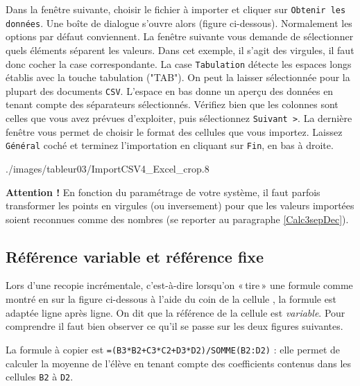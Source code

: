 Dans la fenêtre suivante, choisir le fichier à importer et cliquer sur \texttt{Obtenir les données}. Une boîte de dialogue s'ouvre alors (figure ci-dessous). Normalement les options par défaut conviennent. La fenêtre suivante vous demande de sélectionner quels éléments séparent les valeurs.  Dans cet exemple, il s'agit des virgules, il faut donc cocher la case correspondante. La case \texttt{Tabulation} détecte les espaces longs établis avec la touche tabulation ("TAB"). On peut la laisser sélectionnée pour la plupart des documents \texttt{CSV}. L'espace en bas donne un aperçu des données en tenant compte des séparateurs sélectionnés.  Vérifiez bien que les colonnes sont celles que vous avez prévues d'exploiter, puis sélectionnez \texttt{Suivant >}. La dernière fenêtre vous permet de choisir le format des cellules que vous importez. Laissez \texttt{Général} coché et terminez l'importation en cliquant sur \texttt{Fin}, en bas à droite.

%
		{./images/tableur03/ImportCSV4_Excel_crop}{.8\textwidth}

\textbf{Attention !} En fonction du paramétrage de votre système, il faut parfois transformer les points en virgules (ou inversement) pour que les valeurs importées soient reconnues comme des nombres (se reporter au paragraphe \vref{Calc3sepDec}).



\subsection{Référence variable et référence fixe}\label{Calc3reference} 

Lors d'une recopie incrémentale, c'est-à-dire lorsqu'on «\,tire\,» une formule comme montré en  sur la figure ci-dessous à l'aide du coin de la cellule , la formule est adaptée ligne après ligne. On dit que la référence de la cellule est \emph{variable}. Pour comprendre il faut bien observer ce qu'il se passe sur les deux figures suivantes.


La formule à copier est \texttt{=(B3*B2+C3*C2+D3*D2)/SOMME(B2:D2)} : elle permet de calculer la moyenne de l'élève en tenant compte des coefficients contenus dans les cellules \texttt{B2} à \texttt{D2}.


